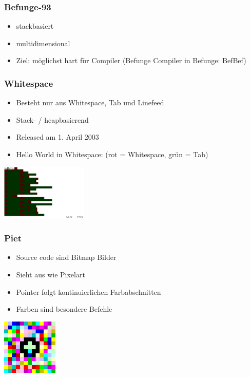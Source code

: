 \documentclass{beamer}
\begin{document}
	\begin{frame}
		\frametitle{Befunge-93}
		\begin{itemize}
			\item stackbasiert
			\item multidimensional
			\item Ziel: möglichst hart für Compiler (Befunge Compiler in Befunge: BefBef)
		\end{itemize}
		\begin{center}
			
		\end{center}
	\end{frame}
	\begin{frame}
		\frametitle{Whitespace}
		\begin{itemize}
			\item Besteht nur aus Whitespace, Tab und Linefeed
			\item Stack- / heapbasierend
			\item Released am 1. April 2003
			\item Hello World in Whitespace: (rot = Whitespace, grün = Tab)
		\end{itemize}
		\begin{center}
			\includegraphics[height=100px]{images/Whitespace.png}
		\end{center}
	\end{frame}
	\begin{frame}
		\frametitle{Piet}
		\begin{itemize}
			\item Source code sind Bitmap Bilder
			\item Sieht aus wie Pixelart
			\item Pointer folgt kontinuierlichen Farbabschnitten
			\item Farben sind besondere Befehle
		\end{itemize}
		\begin{center}
			\includegraphics[height=100px]{images/piet.png}
		\end{center}
	\end{frame}
\end{document}
